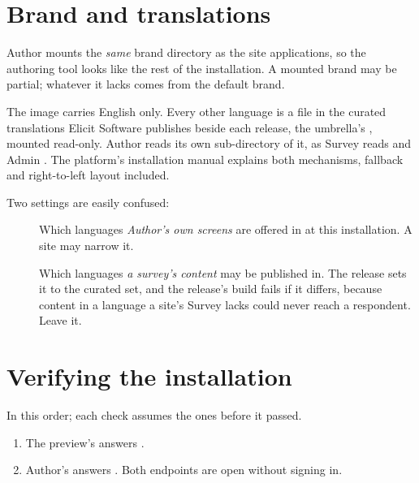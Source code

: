 \documentclass[11pt, a4paper]{article}
\begin{document}
\section{Brand and translations}
\label{sec:brand}

Author mounts the \emph{same} brand directory as the site applications, so the authoring tool
looks like the rest of the installation. A mounted brand may be partial; whatever it lacks
comes from the default brand.

The image carries English only. Every other language is a file in the curated translations
Elicit Software publishes beside each release, the umbrella's , mounted
read-only. Author reads its own  sub-directory of it, as Survey reads
 and Admin . The platform's installation manual explains both
mechanisms, fallback and right-to-left layout included.

Two settings are easily confused:

\begin{description}
  \item[] Which languages \emph{Author's own screens} are offered
        in at this installation. A site may narrow it.
  \item[] Which languages \emph{a survey's content} may be
        published in. The release sets it to the curated set, and the release's build fails
        if it differs, because content in a language a site's Survey lacks could never reach a
        respondent. Leave it.
\end{description}

\section{Verifying the installation}
\label{sec:verify}

In this order; each check assumes the ones before it passed.

\begin{enumerate}
  \item The preview's  answers .
  \item Author's  answers . Both endpoints are open without
        signing in.
\end{enumerate}
\end{document}

